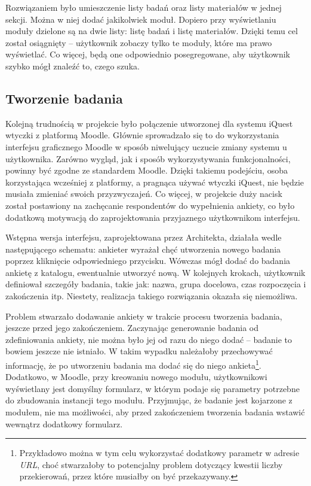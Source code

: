 Rozwiązaniem było umieszczenie listy badań oraz listy materiałów w jednej sekcji. Można w niej dodać jakikolwiek moduł. Dopiero przy wyświetlaniu moduły dzielone są na dwie listy: listę badań i listę materiałów. Dzięki temu cel został osiągnięty -- użytkownik zobaczy tylko te moduły, które ma prawo wyświetlać. Co więcej, będą one odpowiednio posegregowane, aby użytkownik szybko mógł znaleźć to, czego szuka.

\subsection{Tworzenie badania}
\label{Chapter628}

Kolejną trudnością w projekcie było połączenie utworzonej dla systemu iQuest wtyczki z platformą Moodle. Głównie sprowadzało się to do wykorzystania interfejsu graficznego Moodle w sposób niwelujący uczucie zmiany systemu u użytkownika. Zarówno wygląd, jak i sposób wykorzystywania funkcjonalności, powinny być zgodne ze standardem Moodle. Dzięki takiemu podejściu, osoba korzystająca wcześniej z platformy, a pragnąca używać wtyczki iQuest, nie będzie musiała zmieniać swoich przyzwyczajeń. Co więcej, w projekcie duży nacisk został postawiony na zachęcanie respondentów do wypełnienia ankiety, co było dodatkową motywacją do zaprojektowania przyjaznego użytkownikom interfejsu.

Wstępna wersja interfejsu, zaprojektowana przez Architekta, działała wedle następującego schematu: ankieter wyrażał chęć utworzenia nowego badania poprzez kliknięcie odpowiedniego przycisku. Wówczas mógł dodać do badania ankietę z katalogu, ewentualnie utworzyć nową. W kolejnych krokach, użytkownik definiował szczegóły badania, takie jak: nazwa, grupa docelowa, czas rozpoczęcia i zakończenia itp. Niestety, realizacja takiego rozwiązania okazała się niemożliwa.

Problem stwarzało dodawanie ankiety w trakcie procesu tworzenia badania, jeszcze przed jego zakończeniem. Zaczynając generowanie badania od zdefiniowania ankiety, nie można było jej od razu do niego dodać -- badanie to bowiem jeszcze nie istniało. W takim wypadku należałoby przechowywać informację, że po utworzeniu badania ma dodać się do niego ankieta\footnote{Przykładowo można w tym celu wykorzystać dodatkowy parametr w adresie \textit{URL}, choć stwarzałoby to potencjalny problem dotyczący kwestii liczby przekierowań, przez które musiałby on być przekazywany.}. Dodatkowo, w Moodle, przy kreowaniu nowego modułu, użytkownikowi wyświetlany jest domyślny formularz, w którym podaje się parametry potrzebne do zbudowania instancji tego modułu. Przyjmując, że badanie jest kojarzone z modułem, nie ma możliwości, aby przed zakończeniem tworzenia badania wstawić wewnątrz dodatkowy formularz.

